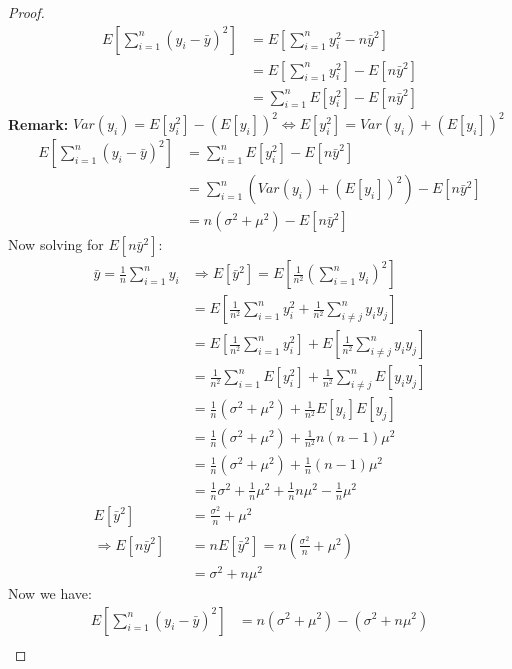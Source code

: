 \documentclass[12pt]{article}
\begin{document}
\begin{enumerate}[1.]
\begin{proof}
\begin{align*}
                E[\sum_{i=1}^{n} (y_i-\bar{y})^2] &= E[\sum_{i=1}^{n} y_i^2 - n\bar{y}^2] \\
                &= E[\sum_{i=1}^{n} y_i^2] - E[n\bar{y}^2] \\
                &= \sum_{i=1}^{n}E[y_i^2] - E[n\bar{y}^2]
            \end{align*}
            \textbf{Remark:} $Var(y_i) = E[y_i^2] - (E[y_i])^2 \Leftrightarrow E[y_i^2] = Var(y_i) + (E[y_i])^2$
            \begin{align*}
                E[\sum_{i=1}^{n} (y_i-\bar{y})^2] &= \sum_{i=1}^{n}E[y_i^2] - E[n\bar{y}^2] \\
                &= \sum_{i=1}^{n} (Var(y_i) + (E[y_i])^2) - E[n\bar{y}^2] \\
                &= n(\sigma^2 + \mu^2) - E[n\bar{y}^2]
            \end{align*}
            Now solving for $E[n\bar{y}^2]\colon$
            \begin{align*}
                \bar{y} = \frac{1}{n}\sum_{i=1}^{n} y_i &\Rightarrow E[\bar{y}^2] = E[\frac{1}{n^2} (\sum_{i=1}^{n}y_i)^2] \\
                &= E[\frac{1}{n^2} \sum_{i=1}^{n}y_i^2 + \frac{1}{n^2}\sum_{i \neq j}^{n} y_i y_j] \\
                &= E[\frac{1}{n^2} \sum_{i=1}^{n}y_i^2] + E[\frac{1}{n^2}\sum_{i \neq j}^{n} y_i y_j] \\
                &= \frac{1}{n^2} \sum_{i=1}^{n}E[y_i^2] + \frac{1}{n^2}\sum_{i \neq j}^{n}E[y_i y_j] \\ 
                &= \frac{1}{n} (\sigma^2 + \mu^2) + \frac{1}{n^2} E[y_i]E[y_j] \\
                &= \frac{1}{n} (\sigma^2 + \mu^2) + \frac{1}{n^2} n(n - 1)\mu^2 \\
                &= \frac{1}{n} (\sigma^2 + \mu^2) + \frac{1}{n} (n - 1)\mu^2 \\
                &= \frac{1}{n} \sigma^2 + \frac{1}{n}\mu^2 + \frac{1}{n}n\mu^2 - \frac{1}{n}\mu^2 \\
                E[\bar{y}^2] &= \frac{\sigma^2}{n} + \mu^2 \\
                \Rightarrow E[n\bar{y}^2] &= nE[\bar{y}^2] = n(\frac{\sigma^2}{n} + \mu^2) \\
                &= \sigma^2 + n\mu^2
            \end{align*}
            Now we have:
            \begin{align*}
                E[\sum_{i=1}^{n} (y_i-\bar{y})^2] &= n(\sigma^2 + \mu^2) - (\sigma^2 + n\mu^2) \\

\end{align*}
\end{proof}
\end{enumerate}
\end{document}
